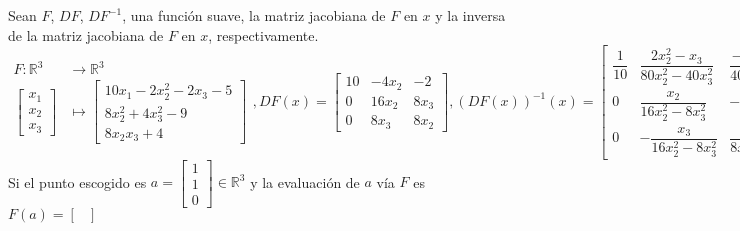 \begin{frame}
	\begin{solution}
		Sean $F$, $DF$, $DF^{-1}$, una función suave, la matriz jacobiana
		de $F$ en $x$ y la inversa de la matriz jacobiana de $F$ en $x$,
		respectivamente.
		\begin{equation*}
			\begin{aligned}
				F\colon\mathbb{R}^{3} & \longrightarrow\mathbb{R}^{3} \\
				\begin{bmatrix}
					x_{1} \\
					x_{2} \\
					x_{3}
				\end{bmatrix}
				                      & \longmapsto
				\begin{bmatrix}
					10x_{1}-2x^{2}_{2}-2x_{3}-5 \\
					8x^2_{2}+4x^2_{3}-9         \\
					8x_{2}x_{3}+4
				\end{bmatrix}
			\end{aligned},
			DF\left(x\right)=
			\begin{bmatrix}
				10 & -4x_{2} & -2     \\
				0  & 16x_{2} & 8x_{3} \\
				0  & 8x_{3}  & 8x_{2}
			\end{bmatrix},
			{\left(DF\left(x\right)\right)}^{-1}\left(x\right)=
			\begin{bmatrix}
				\dfrac{1}{10} & \dfrac{2x^{2}_{2} - x_{3}}{80x^{2}_{2} - 40x^{2}_{3}} & \dfrac{-x_{2}x_{3} + x_{2}}{40x^{2}_{2} - 20x^{2}_{3}} \\
				0             & \dfrac{x_{2}}{16x^{2}_{2} - 8x^{2}_{3}}               & -\dfrac{x_{3}}{16x^{2}_{2} - 8x^{2}_{3}}               \\
				0             & -\dfrac{x_{3}}{16x^{2}_{2} - 8x^{2}_{3}}              & \dfrac{x_{2}}{8x^{2}_{2} - 4x^{2}_{3}}
			\end{bmatrix}.
		\end{equation*}
		Si el punto escogido es
		\begin{math}
			a=
			\begin{bmatrix}
				1 \\
				1 \\
				0
			\end{bmatrix}
			\in\mathbb{R}^{3}
		\end{math}
		y la evaluación de $a$ vía $F$ es
		\begin{math}
			F\left(a\right)=
			\begin{bmatrix}

\end{bmatrix}
\end{math}
\end{solution}
\end{frame}
